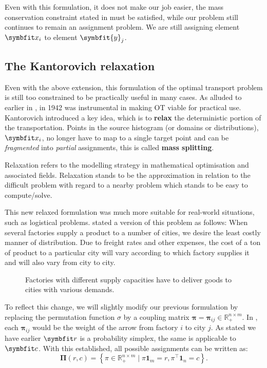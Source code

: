 Even with this formulation, it does not make our job easier, the mass conservation constraint stated in  must be satisfied, while our problem still continues to remain an assignment problem. We are still assigning element $\bfitx_i$ to element $\symbfit{y}_j$.

\subsection{The Kantorovich relaxation}\label{ssec:ot-kantorovich-relax}

Even with the above extension, this formulation of the optimal transport problem is still too constrained to be practically useful in many cases. As alluded to earlier in , in 1942 \citeauthor{Kantorovich42} was instrumental in making OT viable for practical use. Kantorovich introduced a key idea, which is to \textbf{relax} the deterministic portion of the transportation. Points in the source histogram (or domains or distributions), $\bfitx_i$, no longer have to map to a single target point and can be \textit{fragmented} into \textit{partial} assignments, this is called \textbf{mass splitting}.

\begin{tcolorbox}[title=Relaxation]
Relaxation refers to the modelling strategy in mathematical optimisation and associated fields. Relaxation stands to be the approximation in relation to the difficult problem with regard to a nearby problem which stands to be easy to compute/solve.
\end{tcolorbox}

This new relaxed formulation was much more suitable for real-world situations, such as logistical problems. \textcite{hitchcock1941distribution} stated a version of this problem as follows:
When several factories supply a product to a number of cities, we desire the least costly manner of distribution. Due to freight rates and other expenses, the cost of a ton of product to a particular city will vary according to which factory supplies it and will also vary from city to city.
\begin{figure}[ht]
    \centering
    
    \caption{Factories with different supply capacities have to deliver goods to cities with various demands.}
    \label{fig:ot-factories}
\end{figure}

To reflect this change, we will slightly modify our previous formulation by replacing the permutation function $\sigma$ by a coupling matrix $\symbf{\pi} = \symbf{\pi}_{i j} \in \mathbb{R}_{+}^{n \times m}$. In , each $\symbf{\pi}_{i j}$ would be the weight of the arrow from factory $i$ to city $j$.
As stated we have earlier $\bfitr$ is a probability simplex, the same is applicable to $\bfitc$. With this established, all possible assignments can be written as:
\begin{equation} 
\label{eqn:ot-def}
\symbf{\Pi}(r, c)=\left\{\pi \in \mathbb{R}_{+}^{n \times m} \mid \pi \symbf{1}_{m}=r, \pi^{\top} \symbf{1}_{n}=c\right\}.
\end{equation}

